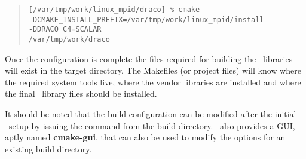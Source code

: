 \footnotesize
\begin{verse}
\texttt{[/var/tmp/work/linux\_mpid/draco] \% cmake \\
  \hspace{0.5in}-DCMAKE\_INSTALL\_PREFIX=/var/tmp/work/linux\_mpid/install  \\
  \hspace{0.5in}-DDRACO\_C4=SCALAR \\
  \hspace{0.5in}/var/tmp/work/draco} \\
\end{verse}
\normalsize

Once the configuration is complete the files required for building the
\draco\ libraries will exist in the target directory.  The Makefiles
(or project files) will know where the required system tools live,
where the vendor libraries are installed and where the final
\draco\ library files should be installed.

It should be noted that the build configuration can be modified after
the initial \cmake\ setup by issuing the command 
from the build directory.  \cmake\ also provides a GUI, aptly named
\textbf{cmake-gui}, that can also be used to modify the options for an
existing build directory. 






